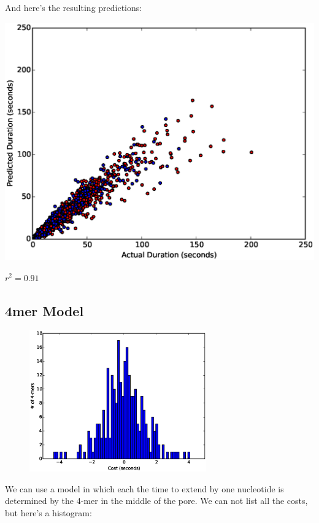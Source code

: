         \vspace{1.5in}

        And here's the resulting predictions:
        
\includegraphics[width=\textwidth]{part11scatter3mer}

$r^2=0.91$


        \newpage
        \subsection*{4mer Model}
        \begin{figure}
        \vspace{-50pt}
        \includegraphics[width=3in]{part11hist4}
        \vspace{-70pt}
        \end{figure}
        We can use a model in which each the time to extend by one nucleotide is determined by the 4-mer in the middle of the
        pore.  We can not list all the costs, but here's a histogram:

